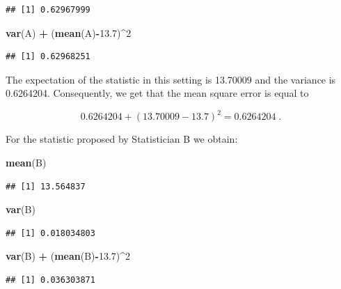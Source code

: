 \documentclass[]{krantz}
\makeatletter
\newenvironment{Shaded}{\begin{snugshade}}{\end{snugshade}}
\newcommand{\DecValTok}[1]{\textcolor[rgb]{0.00,0.00,0.81}{#1}}
\newcommand{\FloatTok}[1]{\textcolor[rgb]{0.00,0.00,0.81}{#1}}
\newcommand{\KeywordTok}[1]{\textcolor[rgb]{0.13,0.29,0.53}{\textbf{#1}}}
\newcommand{\NormalTok}[1]{#1}
\newcommand{\OperatorTok}[1]{\textcolor[rgb]{0.81,0.36,0.00}{\textbf{#1}}}
\newcommand{\StringTok}[1]{\textcolor[rgb]{0.31,0.60,0.02}{#1}}
\newenvironment{kframe}{%
\medskip{}
\setlength{\fboxsep}{.8em}
 \def\at@end@of@kframe{}%
 \ifinner\ifhmode%
  \def\at@end@of@kframe{\end{minipage}}%
  \begin{minipage}{\columnwidth}%
 \fi\fi%
 \def\FrameCommand##1{\hskip\@totalleftmargin \hskip-\fboxsep
 \colorbox{shadecolor}{##1}\hskip-\fboxsep
     \hskip-\linewidth \hskip-\@totalleftmargin \hskip\columnwidth}%
 \MakeFramed {\advance\hsize-\width
   \@totalleftmargin\z@ \linewidth\hsize
   \@setminipage}}%
 {\par\unskip\endMakeFramed%
 \at@end@of@kframe}
\renewenvironment{Shaded}{\begin{kframe}}{\end{kframe}}
\theoremstyle{definition}
\theoremstyle{definition}
\theoremstyle{definition}
\theoremstyle{remark}
\makeatother
\begin{document}
\begin{verbatim}
## [1] 0.62967999
\end{verbatim}

\begin{Shaded}
\begin{Highlighting}[]
\KeywordTok{var}\NormalTok{(A) }\OperatorTok{+}\StringTok{ }\NormalTok{(}\KeywordTok{mean}\NormalTok{(A)}\OperatorTok{-}\FloatTok{13.7}\NormalTok{)}\OperatorTok{^}\DecValTok{2}
\end{Highlighting}
\end{Shaded}

\begin{verbatim}
## [1] 0.62968251
\end{verbatim}

The expectation of the statistic in this setting is 13.70009 and the
variance is 0.6264204. Consequently, we get that the mean square error
is equal to

\[0.6264204 + (13.70009 - 13.7)^2 = 0.6264204\;.\]

For the statistic proposed by Statistician B we obtain:

\begin{Shaded}
\begin{Highlighting}[]
\KeywordTok{mean}\NormalTok{(B)}
\end{Highlighting}
\end{Shaded}

\begin{verbatim}
## [1] 13.564837
\end{verbatim}

\begin{Shaded}
\begin{Highlighting}[]
\KeywordTok{var}\NormalTok{(B)}
\end{Highlighting}
\end{Shaded}

\begin{verbatim}
## [1] 0.018034803
\end{verbatim}

\begin{Shaded}
\begin{Highlighting}[]
\KeywordTok{var}\NormalTok{(B) }\OperatorTok{+}\StringTok{ }\NormalTok{(}\KeywordTok{mean}\NormalTok{(B)}\OperatorTok{-}\FloatTok{13.7}\NormalTok{)}\OperatorTok{^}\DecValTok{2}
\end{Highlighting}
\end{Shaded}

\begin{verbatim}
## [1] 0.036303871
\end{verbatim}
\end{document}

